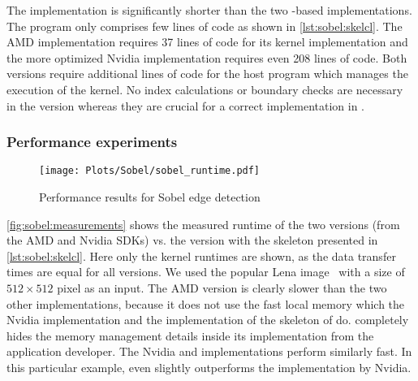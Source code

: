 The \SkelCL implementation is significantly shorter than the two \OpenCL-based implementations.
The \SkelCL program only comprises few lines of code as shown in \autoref{lst:sobel:skelcl}.
The AMD implementation requires 37 lines of code for its kernel implementation and the more optimized Nvidia implementation requires even 208 lines of code.
Both versions require additional lines of code for the host program which manages the execution of the \OpenCL kernel.
No index calculations or boundary checks are necessary in the \SkelCL version whereas they are crucial for a correct implementation in \OpenCL.

\subsubsection*{Performance experiments}

\begin{figure}[tbp]
  \vspace{.5em}
  \centering
  \texttt{[image: Plots/Sobel/sobel\_runtime.pdf]}
  \caption{Performance results for Sobel edge detection}
  \label{fig:sobel:measurements}
\end{figure}
\autoref{fig:sobel:measurements} shows the measured runtime of the two \OpenCL versions (from the AMD and Nvidia SDKs) vs. the \SkelCL version with the \stencil skeleton presented in \autoref{lst:sobel:skelcl}.
Here only the kernel runtimes are shown, as the data transfer times are equal for all versions.
We used the popular Lena image~\cite{Lena} with a size of $512\times 512$ pixel as an input.
The AMD version is clearly slower than the two other implementations, because it does not use the fast local memory which the Nvidia implementation and the  implementation of the \stencil skeleton of \SkelCL do.
\SkelCL completely hides the memory management details inside its implementation from the application developer.
The Nvidia and \SkelCL implementations perform similarly fast.
In this particular example, \SkelCL even slightly outperforms the implementation by Nvidia.










